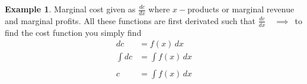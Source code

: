 \documentclass[11pt,a4paper]{article}
\theoremstyle{definition}
\newtheorem{example}[thm]{Example}
\begin{document}
\begin{enumerate}
\begin{example}
Marginal cost given as $\frac{dc}{dx}$ where $x-$products or marginal revenue and marginal profits. All these functions are first derivated such that $\frac{dc}{dx}\quad  \implies\,$ to find the cost function you simply find
\begin{align*}
dc & = f(x)\,dx\\
\int dc & = \int f(x)\,dx\\\\
c & = \int f(x)\,dx\\\\\
\end{align*}
\end{example}
\end{enumerate}
\end{document}
